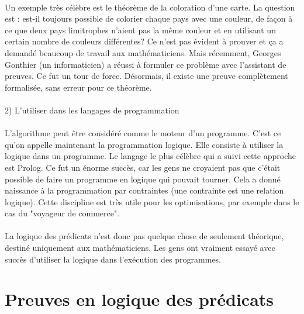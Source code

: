 \subsubsection{}
    
    Un exemple très célèbre est le théorème de la coloration d'une carte. La question est : est-il toujours possible de colorier chaque pays avec une couleur, de façon à ce que deux pays limitrophes n'aient pas la même couleur et en utilisant un certain nombre de couleurs différentes? Ce n'est pas évident à prouver et ça a demandé beaucoup de travail aux mathématiciens. Mais récemment, Georges Gonthier (un informaticien) a réussi à formuler ce problème avec l'assistant de preuves. Ce fut un tour de force. Désormais, il existe une preuve complètement formalisée, sans erreur pour ce théorème.

\subsubsection{}
2) L'utiliser dans les langages de programmation
\subsubsection{}

    L'algorithme peut être considéré comme le moteur d'un programme. C'est ce qu'on appelle maintenant la programmation logique. Elle consiste à utiliser la logique dans un programme. Le langage le plus célèbre qui a suivi cette approche est Prolog. Ce fut un énorme succès, car les gens ne croyaient pas que c'était possible de faire un programme en logique qui pouvait tourner. Cela a donné naissance à la programmation par contraintes (une contrainte est une relation logique). Cette discipline est très utile pour les optimisations, par exemple dans le cas du "voyageur de commerce".

\subsubsection{}
La logique des prédicats n'est donc pas quelque chose de seulement théorique, destiné uniquement aux mathématiciens. Les gens ont vraiment essayé avec succès d'utiliser la logique dans l'exécution des programmes.
\subsubsection{}

\chapter{Preuves en logique des prédicats}


